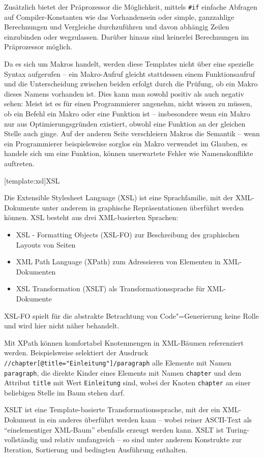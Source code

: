 \documentclass[11pt, a4paper, bibgerm]{scrbook}
\newcommand\icode[1]{\lstinline?#1?}
\newcommand\lsection{}
\newcommand{\cgen}{Code"=Generierung}
\begin{document}
Zusätzlich bietet der Präprozessor die Möglichkeit, mittels \icode{#if}
einfache Abfragen auf Compiler-Konstanten wie das Vorhandensein oder
simple, ganzzahlige Berechnungen und Vergleiche durchzuführen und davon
abhängig Zeilen einzubinden oder wegzulassen. Darüber hinaus sind
keinerlei Berechnungen im Präprozessor möglich.

Da es sich um Makros handelt, werden diese Templates nicht über eine
spezielle Syntax aufgerufen -- ein Makro-Aufruf gleicht stattdessen
einem Funktionsaufruf und die Unterscheidung zwischen beiden erfolgt
durch die Prüfung, ob ein Makro dieses Namens vorhanden ist. Dies kann
man sowohl positiv als auch negativ sehen: Meist ist es für einen
Programmierer angenehm, nicht wissen zu müssen, ob ein Befehl ein Makro
oder eine Funktion ist -- insbesondere wenn ein Makro nur aus
Optimierungsgründen existiert, obwohl eine Funktion an der gleichen
Stelle auch ginge. Auf der anderen Seite verschleiern Makros die
Semantik -- wenn ein Programmierer beispielsweise sorglos ein Makro
verwendet im Glauben, es handele sich um eine Funktion, können
unerwartete Fehler wie Namenskonflikte auftreten.

\lsection[template:xsl]{XSL}

Die Extensible Stylesheet Language (XSL) \cite{XSLT} ist eine
Sprachfamilie, mit der XML-Dokumente unter anderem in graphische
Repräsentationen überführt werden können. XSL besteht aus drei
XML-basierten Sprachen:
\begin{itemize}
\item XSL - Formatting Objects (XSL-FO) zur Beschreibung des graphischen Layouts von Seiten
\item XML Path Language (XPath) zum Adressieren von Elementen in XML-Dokumenten
\item XSL Transformation (XSLT) als Transformationssprache für XML-Dokumente
\end{itemize}
XSL-FO spielt für die abstrakte Betrachtung von \cgen{} keine Rolle und
wird hier nicht näher behandelt.

Mit XPath können komfortabel Knotenmengen in XML-Bäumen referenziert
werden. Beispielsweise selektiert der Ausdruck
\icode{//chapter[@title="Einleitung"]/paragraph} alle Elemente mit Namen
\icode{paragraph}, die direkte Kinder eines Elements mit Namen
\icode{chapter} und dem Attribut \icode{title} mit Wert
\icode{Einleitung} sind, wobei der Knoten \icode{chapter} an einer
beliebigen Stelle im Baum stehen darf.

XSLT ist eine Template-basierte Transformationssprache, mit der ein
XML-Dokument in ein anderes überführt werden kann -- wobei reiner
ASCII-Text als ``einelementiger XML-Baum'' ebenfalls erzeugt werden
kann. XSLT ist Turing-vollständig und relativ umfangreich -- so sind
unter anderem Konstrukte zur Iteration, Sortierung und bedingten
Ausführung enthalten. 
\end{document}
